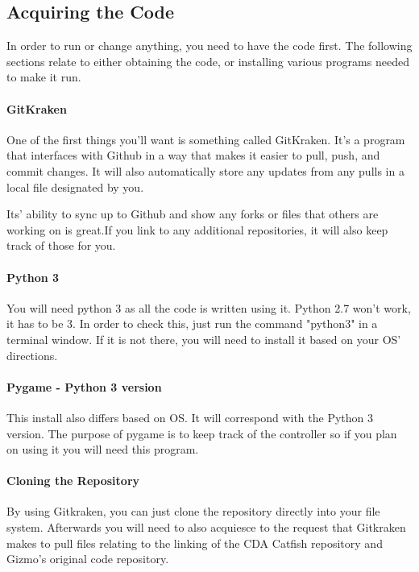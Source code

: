 \documentclass[
18pt, %
a4paper, %
oneside, %
headinclude,footinclude, %
]{scrartcl}
\begin{document}

\subsection{Acquiring the Code}
In order to run or change anything, you need to have the code first. The following sections relate to either obtaining the code, or installing various programs needed to make it run.

\paragraph{GitKraken}
One of the first things you'll want is something called GitKraken. It's a program that interfaces with Github in a way that makes it easier to pull, push, and commit changes. It will also automatically store any updates from any pulls in a local file designated by you. 

Its' ability to sync up to Github and show any forks or files that others are working on is great.If you link to any additional repositories, it will also keep track of those for you.

\paragraph{Python 3}
You will need python 3 as all the code is written using it. Python 2.7 won't work, it has to be 3. In order to check this, just run the command "python3" in a terminal window. If it is not there, you will need to install it based on your OS' directions.

\paragraph{Pygame - Python 3 version}
This install also differs based on OS. It will correspond with the Python 3 version. The purpose of pygame is to keep track of the controller so if you plan on using it you will need this program.

\paragraph{Cloning the Repository}
By using Gitkraken, you can just clone the repository directly into your file system. Afterwards you will need to also acquiesce to the request that Gitkraken makes to pull files relating to the linking of the CDA Catfish repository and Gizmo's original code repository.
\end{document}
